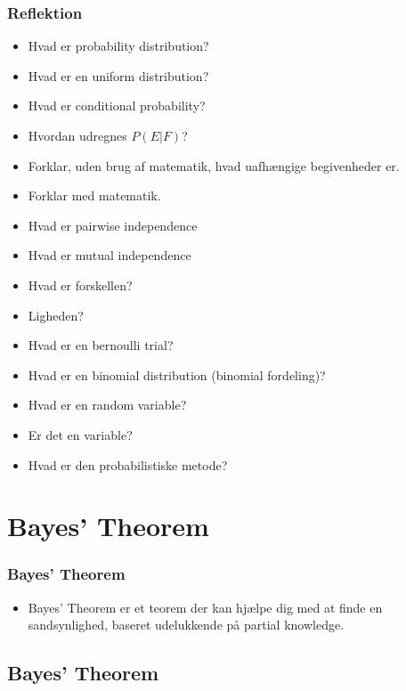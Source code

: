 \documentclass{beamer}
\begin{document}
  \begin{frame}[allowframebreaks]
    \frametitle{Reflektion}
   \begin{itemize}
   \item Hvad er probability distribution? 
   \item Hvad er en uniform distribution?
   \item Hvad er conditional probability?
   \item Hvordan udregnes $P(E|F)$?
   \item Forklar, uden brug af matematik, hvad uafhængige begivenheder er.
   \item Forklar med matematik.
   \item Hvad er pairwise independence
   \item Hvad er mutual independence
   \item Hvad er forskellen?
   \item Ligheden?
   \item Hvad er en bernoulli trial?
   \item Hvad er en binomial distribution (binomial fordeling)?
   \item Hvad er en random variable? 
   \item Er det en variable?
   \item Hvad er den probabilistiske metode?
   \end{itemize} 
\end{frame}

\section{Bayes' Theorem}
\label{sec:bayes}

\begin{frame}
  \frametitle{Bayes' Theorem}
 \begin{itemize}
 \item Bayes' Theorem er et teorem der kan hjælpe dig med at finde en sandsynlighed, baseret udelukkende på partial knowledge.
 \end{itemize} 
\end{frame}

\subsection{Bayes' Theorem}
\label{subsec:bayes-theorem}
\end{document}
